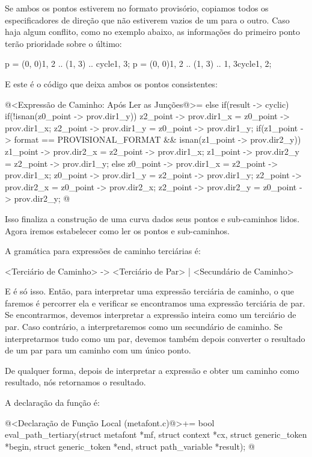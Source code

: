 {{{{{{Se ambos os pontos estiverem no formato provisório, copiamos todos os
especificadores de direção que não estiverem vazios de um para o
outro. Caso haja algum conflito, como no exemplo abaixo, as
informações do primeiro ponto terão prioridade sobre o último:

\alinhaverbatim
p = (0, 0){1, 2} .. (1, 3) .. cycle{1, 3};
p = (0, 0){1, 2} .. (1, 3) .. {1, 3}cycle{1, 2};
\alinhanormal

E este é o código que deixa ambos os pontos consistentes:

\iniciocodigo
@<Expressão de Caminho: Após Ler as Junções@>=
else if(result -> cyclic){
  if(!isnan(z0_point -> prov.dir1_y)){
    z2_point -> prov.dir1_x = z0_point -> prov.dir1_x;
    z2_point -> prov.dir1_y = z0_point -> prov.dir1_y;
    if(z1_point -> format == PROVISIONAL_FORMAT &&
       isnan(z1_point -> prov.dir2_y)){
      z1_point -> prov.dir2_x = z2_point -> prov.dir1_x;
      z1_point -> prov.dir2_y = z2_point -> prov.dir1_y;
    }
  }
  else{
    z0_point -> prov.dir1_x = z2_point -> prov.dir1_x;
    z0_point -> prov.dir1_y = z2_point -> prov.dir1_y;
  }
  z2_point -> prov.dir2_x = z0_point -> prov.dir2_x;
  z2_point -> prov.dir2_y = z0_point -> prov.dir2_y;
}
@
\fimcodigo

Isso finaliza a construção de uma curva dados seus pontos e
sub-caminhos lidos. Agora iremos estabelecer como ler os pontos e
sub-caminhos.


A gramática para expressões de caminho terciárias é:

\alinhaverbatim
<Terciário de Caminho> -> <Terciário de Par> | <Secundário de Caminho>
\alinhanormal

E é só isso. Então, para interpretar uma expressão terciária de
caminho, o que faremos é percorrer ela e verificar se encontramos uma
expressão terciária de par. Se encontrarmos, devemos interpretar a
expressão inteira como um terciário de par. Caso contrário, a
interpretaremos como um secundário de caminho. Se interpretarmos tudo
como um par, devemos também depois converter o resultado de um par
para um caminho com um único ponto.

De qualquer forma, depois de interpretar a expressão e obter um
caminho como resultado, nós retornamos o resultado.

A declaração da função é:

\iniciocodigo
@<Declaração de Função Local (metafont.c)@>+=
bool eval_path_tertiary(struct metafont *mf, struct context *cx,
                        struct generic_token *begin,
                        struct generic_token *end,
                        struct path_variable *result);
@
\fimcodigo

}}}}}}
